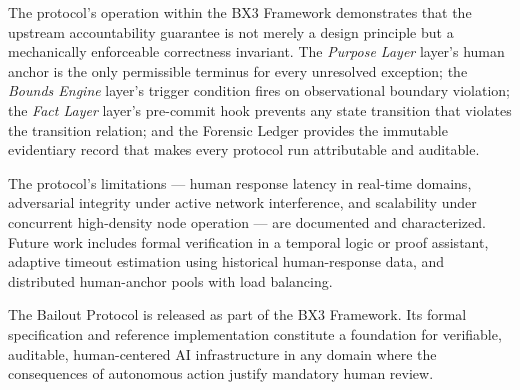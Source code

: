 \documentclass[12pt]{article}
\newcommand{\bxthree}{\mbox{BX3}}
\newcommand{\purpose}{\textit{Purpose Layer}}
\newcommand{\bounds}{\textit{Bounds Engine}}
\newcommand{\fact}{\textit{Fact Layer}}
\begin{document}
The protocol's operation within the \bxthree{} Framework demonstrates that the upstream accountability guarantee is not merely a design principle but a mechanically enforceable correctness invariant. The \purpose{} layer's human anchor is the only permissible terminus for every unresolved exception; the \bounds{} layer's trigger condition fires on observational boundary violation; the \fact{} layer's pre-commit hook prevents any state transition that violates the transition relation; and the Forensic Ledger provides the immutable evidentiary record that makes every protocol run attributable and auditable.

The protocol's limitations --- human response latency in real-time domains, adversarial integrity under active network interference, and scalability under concurrent high-density node operation --- are documented and characterized. Future work includes formal verification in a temporal logic or proof assistant, adaptive timeout estimation using historical human-response data, and distributed human-anchor pools with load balancing.

The Bailout Protocol is released as part of the \bxthree{} Framework. Its formal specification and reference implementation constitute a foundation for verifiable, auditable, human-centered AI infrastructure in any domain where the consequences of autonomous action justify mandatory human review.



\end{document}
